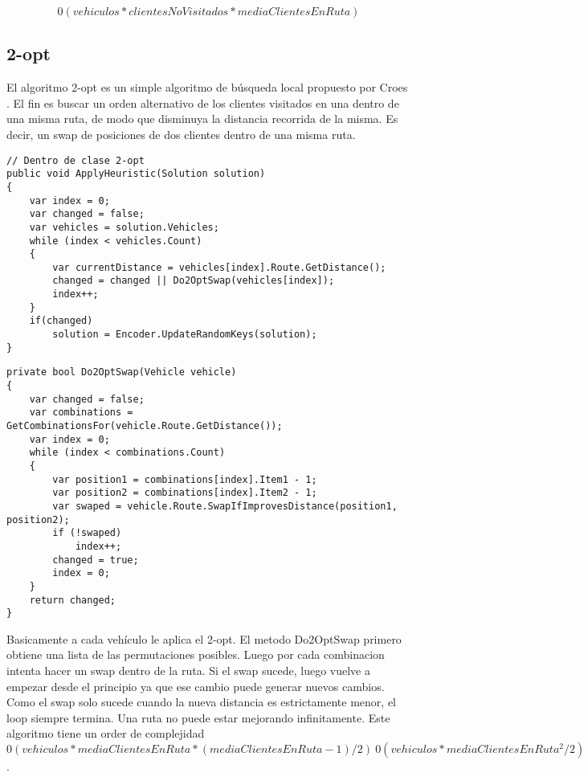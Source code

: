 \begin{equation*}
0(vehiculos * clientesNoVisitados * mediaClientesEnRuta)
\end{equation*}

\subsection{2-opt}

El algoritmo 2-opt es un simple algoritmo de búsqueda local propuesto por Croes \cite{Croes}. El fin es buscar un orden alternativo de los clientes visitados en una dentro de una misma ruta, de modo que disminuya la distancia recorrida de la misma. Es decir, un swap de posiciones de dos clientes dentro de una misma ruta.

\begin{minipage}{\textwidth}
\begin{lstlisting}
// Dentro de clase 2-opt
public void ApplyHeuristic(Solution solution)
{
	var index = 0;
	var changed = false;	
	var vehicles = solution.Vehicles;	
	while (index < vehicles.Count)
	{
		var currentDistance = vehicles[index].Route.GetDistance();
		changed = changed || Do2OptSwap(vehicles[index]);
		index++;
	}
	if(changed)
		solution = Encoder.UpdateRandomKeys(solution);
}
\end{lstlisting}
\end{minipage}

\begin{minipage}{\textwidth}
\begin{lstlisting}
private bool Do2OptSwap(Vehicle vehicle)
{
	var changed = false;	
	var combinations = GetCombinationsFor(vehicle.Route.GetDistance());
	var index = 0;
	while (index < combinations.Count)
	{
		var position1 = combinations[index].Item1 - 1;
		var position2 = combinations[index].Item2 - 1;
		var swaped = vehicle.Route.SwapIfImprovesDistance(position1, position2);
		if (!swaped)
			index++;
		changed = true;
		index = 0;
	}
	return changed;
}
\end{lstlisting}
\end{minipage}

\bigskip

Basicamente a cada vehículo le aplica el 2-opt. El metodo Do2OptSwap primero obtiene una lista de las permutaciones posibles. Luego por cada combinacion intenta hacer un swap dentro de la ruta. Si el swap sucede, luego vuelve a empezar desde el principio ya que ese cambio puede generar nuevos cambios. Como el swap solo sucede cuando la nueva distancia es estrictamente menor, el loop siempre termina. Una ruta no puede estar mejorando infinitamente. Este algoritmo tiene un order de complejidad $0(vehiculos * mediaClientesEnRuta  * (mediaClientesEnRuta - 1) / 2) ~ 0 (vehiculos * mediaClientesEnRuta^2 / 2)$.


